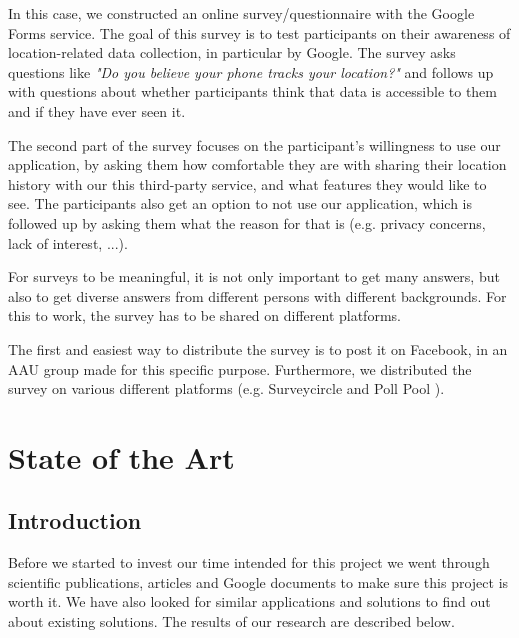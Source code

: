 \documentclass[12p]{article}
\begin{document}
    In this case, we constructed an online survey/questionnaire \cite{Survey} with the Google Forms \cite{GoogleForms} service. The goal of this survey is to test participants on their awareness of location-related data collection, in particular by Google. The survey asks questions like \textit{"Do you believe your phone tracks your location?"} and follows up with questions about whether participants think that data is accessible to them and if they have ever seen it.
    
    The second part of the survey focuses on the participant's willingness to use our application, by asking them how comfortable they are with sharing their location history with our this third-party service, and what features they would like to see. The participants also get an option to not use our application, which is followed up by asking them what the reason for that is (e.g. privacy concerns, lack of interest, ...).
    
    For surveys to be meaningful, it is not only important to get many answers, but also to get diverse answers from different persons with different backgrounds. For this to work, the survey has to be shared on different platforms.
    
    The first and easiest way to distribute the survey is to post it on Facebook, in an AAU group made for this specific purpose. Furthermore, we distributed the survey on various different platforms (e.g. Surveycircle \cite{Surveycircle} and Poll Pool \cite{PollPool}).

	
\newpage
\section{State of the Art} \label{sec:StateOfTheArt}
	\subsection{Introduction}
	
Before we started to invest our time intended for this project we went through scientific publications, articles and Google documents to make sure this project is worth it. We have also looked for similar applications and solutions to find out about existing solutions. The results of our research are described below. 
\end{document}
